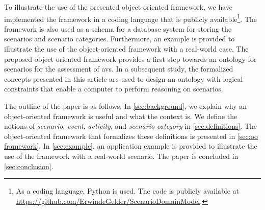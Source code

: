 To illustrate the use of the presented object-oriented framework, we have implemented the framework in a coding language that is publicly available\footnote{As a coding language, Python is used. The code is publicly available at \url{https://github.com/ErwindeGelder/ScenarioDomainModel}.}.
The framework is also used as a schema for a database system for storing the scenarios and scenario categories.
Furthermore, an example is provided to illustrate the use of the object-oriented framework with a real-world case.
The proposed object-oriented framework provides a first step towards an ontology for scenarios for the assessment of \acp{av}. In a subsequent study, the formalized concepts presented in this article are used to design an ontology with logical constraints that enable a computer to perform reasoning on scenarios.
\cendc

The outline of the paper is as follows. In \cref{sec:background}, we explain why an \cstartb object-oriented framework \cendb is useful and what the context is. 
We define the notions of \emph{scenario}, \emph{event}, \emph{activity}, and \emph{scenario category}  in \cref{sec:definitions}. 
The \cstartb object-oriented framework \cendb that formalizes these definitions is presented in \cref{sec:oo framework}. 
In \cref{sec:example}, an application example is provided to illustrate the use of the \cstartb framework \cendb with a real-world scenario. 
The paper is concluded in \cref{sec:conclusion}.

